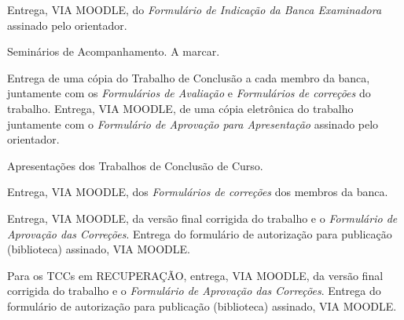 
    {Entrega, VIA MOODLE, do \emph{Formulário de Indicação da Banca Examinadora} assinado pelo orientador. }

    {
     Seminários de Acompanhamento. A marcar. 
    }

    {Entrega de uma cópia do Trabalho de Conclusão a cada membro da banca, juntamente com os \emph{Formulários de Avaliação} e \emph{Formulários de correções} do trabalho. Entrega, VIA MOODLE, de uma cópia eletrônica do trabalho juntamente com o \emph{Formulário de Aprovação para Apresentação} assinado pelo orientador.}


    {Apresentações dos Trabalhos de Conclusão de Curso. }

    {Entrega, VIA MOODLE, dos \emph{Formulários de correções} dos membros da banca.}

    {Entrega, VIA MOODLE, da versão final corrigida do trabalho e o \emph{Formulário de Aprovação das Correções}. Entrega do formulário de autorização para publicação (biblioteca) assinado, VIA MOODLE. }

    {Para os TCCs em RECUPERAÇÃO, entrega, VIA MOODLE, da versão final corrigida do trabalho e o \emph{Formulário de Aprovação das Correções}. Entrega do formulário de autorização para publicação (biblioteca) assinado, VIA MOODLE. }


